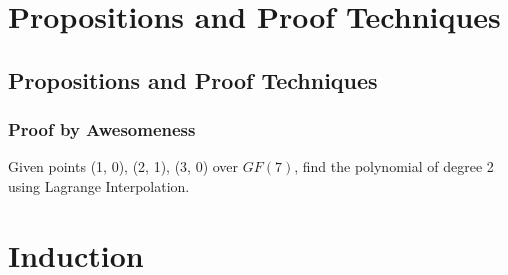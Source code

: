 \documentclass[9pt]{beamer}
\title{\themidterm}
\author{\theauthors}
\institute{\theorganization}
\date{\thedate}
\begin{document}

\begin{frame}[fragile]
  \titlepage
\end{frame}


\section{Propositions and Proof Techniques}
\subsection{Propositions and Proof Techniques}

\begin{frame}[fragile]
  \frametitle{Proof by Awesomeness}
Given points (1, 0), (2, 1), (3, 0) over $GF(7)$, find the polynomial of degree 2 using Lagrange Interpolation. \newline
{}
\end{frame}



\section{Induction}
\end{document}
